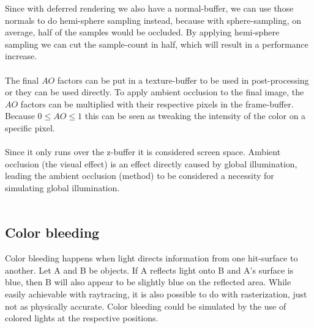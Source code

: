 \documentclass{ACGSeminar}
\begin{document}
		Since with deferred rendering we also have a normal-buffer, we can use those normals to do hemi-sphere sampling instead, because with sphere-sampling, on average, half of the samples would be occluded. By applying hemi-sphere sampling we can cut the sample-count in half, which will result in a performance increase. \\\\
		The final $AO$ factors can be put in a texture-buffer to be used in post-processing or they can be used directly. To apply ambient occlusion to the final image, the $AO$ factors can be multiplied with their respective pixels in the frame-buffer. Because $0 \leq AO \leq 1$ this can be seen as tweaking the intensity of the color on a specific pixel. \\\\
		Since it only runs over the z-buffer it is considered screen space. Ambient occlusion (the visual effect) is an effect directly caused by global illumination, leading the ambient occlusion (method) to be considered a necessity for simulating global illumination. \\\\

	\subsection{Color bleeding}
		Color bleeding happens when light directs information from one hit-surface to another. Let A and B be objects. If A reflects light onto B and A's surface is blue, then B will also appear to be slightly blue on the reflected area. While easily achievable with raytracing, it is also possible to do with rasterization, just not as physically accurate. Color bleeding could be simulated by the use of colored lights at the respective positions.
\end{document}
